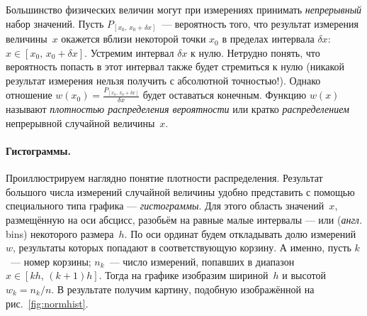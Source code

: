 
Большинство физических величин могут при измерениях принимать \emph{непрерывный} набор значений. Пусть $P_{[x_0,\,x_0+\delta x]}$~--- вероятность того, что результат
измерения величины~$x$ окажется вблизи некоторой точки $x_0$ в пределах интервала $\delta x$: $x\in [x_0,\,x_0+\delta x]$.
Устремим интервал
$\delta x$ к нулю. Нетрудно понять, что вероятность попасть в этот интервал
также будет стремиться к нулю (никакой результат измерения нельзя получить с абсолютной точностью!). Однако отношение
$w(x_0) = \frac{P_{[x_0,\,x_0+\delta x]}}{\delta x}$ будет оставаться конечным.
Функцию $w(x)$ называют \emph{плотностью распределения вероятности} или кратко
\emph{распределением} непрерывной случайной величины~$x$.


\paragraph{Гистограммы.}
Проиллюстрируем наглядно понятие плотности распределения. Результат
большого числа измерений случайной величины удобно представить с помощью
специального типа графика --- \emph{гистограммы}.
Для этого область значений~$x$, размещённую на оси абсцисс, разобьём на
равные малые интервалы ---  или  (\emph{англ.} bins)
некоторого размера~$h$. По оси ординат будем откладывать долю измерений~$w$,
результаты которых попадают в соответствующую корзину. А именно,
пусть $k$~--- номер корзины; $n_k$~--- число измерений, попавших
в диапазон $x\in [kh,\,(k+1)h]$. Тогда  на графике изобразим 
шириной~$h$ и высотой $w_{k}=n_{k}/n$.
В результате получим картину, подобную изображённой на рис.~\ref{fig:normhist}.

